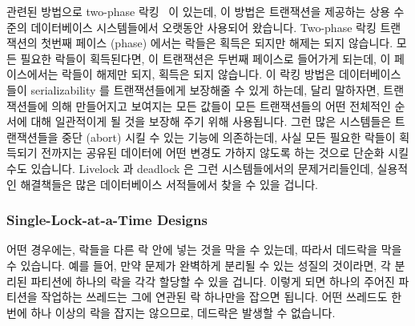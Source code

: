 관련된 방법으로 two-phase 락킹~\cite{PhilipABernstein1987} 이 있는데, 이 방법은
트랜잭션을 제공하는 상용 수준의 데이터베이스 시스템들에서 오랫동안 사용되어
왔습니다.
Two-phase 락킹 트랜잭션의 첫번째 페이스 (phase) 에서는 락들은 획득은 되지만
해제는 되지 않습니다.
모든 필요한 락들이 획득된다면, 이 트랜잭션은 두번째 페이스로 들어가게 되는데,
이 페이스에서는 락들이 해제만 되지, 획득은 되지 않습니다.
이 락킹 방법은 데이터베이스들이 serializability 를 트랜잭션들에게 보장해줄 수
있게 하는데, 달리 말하자면, 트랜잭션들에 의해 만들어지고 보여지는 모든 값들이
모든 트랜잭션들의 어떤 전체적인 순서에 대해 일관적이게 될 것을 보장해 주기 위해
사용됩니다.
그런 많은 시스템들은 트랜잭션들을 중단 (abort) 시킬 수 있는 기능에 의존하는데,
사실 모든 필요한 락들이 획득되기 전까지는 공유된 데이터에 어떤 변경도 가하지
않도록 하는 것으로 단순화 시킬 수도 있습니다.
Livelock 과 deadlock 은 그런 시스템들에서의 문제거리들인데, 실용적인 해결책들은
많은 데이터베이스 서적들에서 찾을 수 있을 겁니다.

\subsubsection{Single-Lock-at-a-Time Designs}
\label{sec:locking:Single-Lock-at-a-Time Designs}

어떤 경우에는, 락들을 다른 락 안에 넣는 것을 막을 수 있는데, 따라서 데드락을
막을 수 있습니다.
예를 들어, 만약 문제가 완벽하게 분리될 수 있는 성질의 것이라면, 각 분리된
파티션에 하나의 락을 각각 할당할 수 있을 겁니다.
이렇게 되면 하나의 주어진 파티션을 작업하는 쓰레드는 그에 연관된 락 하나만을
잡으면 됩니다.
어떤 쓰레드도 한번에 하나 이상의 락을 잡지는 않으므로, 데드락은 발생할 수
없습니다.


